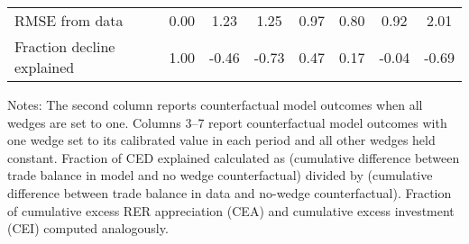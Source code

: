 \begin{table}[p]
\begin{center}
\begin{threeparttable}
\begin{tabular}{lccccccc}
RMSE from data& 0.00 & 1.23 & 1.25 & 0.97 & 0.80 & 0.92 & 2.01\\
Fraction decline explained& 1.00 & -0.46 & -0.73 & 0.47 & 0.17 & -0.04 & -0.69\\
\bottomrule
\end{tabular}
\begin{tablenotes}
\item Notes: The second column reports counterfactual model outcomes when all wedges are set to one. Columns 3--7 report counterfactual model outcomes with one wedge set to its calibrated value in each period and all other wedges held constant. Fraction of CED explained calculated as (cumulative difference between trade balance in model and no wedge counterfactual) divided by (cumulative difference between trade balance in data and no-wedge counterfactual). Fraction of cumulative excess RER appreciation (CEA) and cumulative excess investment (CEI) computed analogously.\end{tablenotes}
\end{threeparttable}
\end{center}
\normalsize
\end{table}
